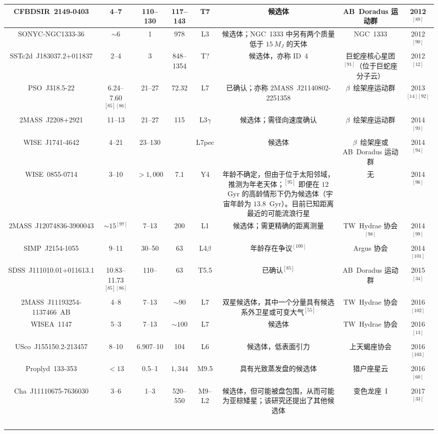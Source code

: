 \begin{table}[ht]
\begin{tabular}{|c|c|c|c|c|c|c|c|}
\hline
CFBDSIR~2149-0403 & 4--7 & 110--130 & 117--143 & T7 & 候选体 & AB~Doradus 运动群 & 2012$^{[89]}$\\
\hline
SONYC-NGC1333-36 & $\sim6$ & 1 & 978 & L3 & 候选体；NGC~1333 中另有两个质量低于 $15\,M_J$ 的天体 & NGC~1333 & 2012$^{[90]}$\\
\hline
SSTc2d~J183037.2+011837 & 2--4 & 3 & 848--1354 & T? & 候选体，亦称 ID~4  & 巨蛇座核心星团$^{[91]}$（位于巨蛇座分子云） & 2012$^{[12]}$\\
\hline
PSO~J318.5-22 & 6.24--7.60$^{[85][86]}$ & 21--27 & 72.32 & L7 & 已确认；亦称 2MASS~J21140802-2251358 & $\beta$~绘架座运动群 & 2013$^{[14][92]}$\\
\hline
2MASS~J2208+2921 & 11--13  & 21--27 & 115 & L3$\gamma$ & 候选体；需径向速度确认 & $\beta$~绘架座运动群 & 2014$^{[93]}$\\
\hline
WISE~J1741-4642 & 4--21 & 23--130 &  & L7pec  & 候选体  & $\beta$~绘架座或 AB~Doradus 运动群 & 2014$^{[94]}$\\
\hline
WISE~0855-0714 & 3--10 & $>1{,}000$ & 7.1 & Y4 & 年龄不确定，但由于位于太阳邻域，推测为年老天体；$^{[95]}$ 即便在 $12$~Gyr 的高龄情形下仍为候选体（宇宙年龄为 $13.8$~Gyr）。目前已知距离最近的可能流浪行星 & 无 & 2014$^{[96]}$\\
\hline
2MASS~J12074836-3900043 & $\sim15$$^{[97]}$ & 7--13 & 200 & L1 & 候选体；需更精确的距离测量 & TW~Hydrae 协会$^{[98]}$ & 2014$^{[99]}$\\
\hline
SIMP~J2154-1055 & 9--11 & 30--50 & 63 & L4$\beta$ & 年龄存在争议$^{[100]}$ & Argus 协会 & 2014$^{[101]}$\\
\hline
SDSS~J111010.01+011613.1 & 10.83--11.73$^{[85][86]}$ & 110-- & 63 & T5.5 & 已确认$^{[85]}$ & AB~Doradus 运动群 & 2015$^{[34]}$\\
\hline
2MASS~J11193254-1137466~AB & 4--8 & 7--13 & $\sim90$ & L7 & 双星候选体，其中一个分量具有候选系外卫星或可变大气$^{[55]}$ & TW~Hydrae 协会 & 2016$^{[102]}$\\
\hline
WISEA~1147 & 5--3 & 7--13 & $\sim100$ & L7 & 候选体 & TW~Hydrae 协会  & 2016$^{[13]}$\\
\hline
USco~J155150.2-213457 & 8--10 & 6.907--10 & 104 & L6 & 候选体，低表面引力 &上天蝎座协会 & 2016$^{[103]}$\\
\hline
Proplyd~133-353 & $<13$ & 0.5--1 & $1{,}344$ & M9.5 & 具有光致蒸发盘的候选体 & 猎户座星云 & 2016$^{[60]}$\\
\hline
Cha~J11110675-7636030 & 3--6 & 1--3 & 520--550  & M9--L2 & 候选体，但可能被盘包围，从而可能为亚棕矮星；该研究还提出了其他候选体 & 变色龙座~I & 2017$^{[33]}$\\
$$
\end{tabular}
\end{table}
